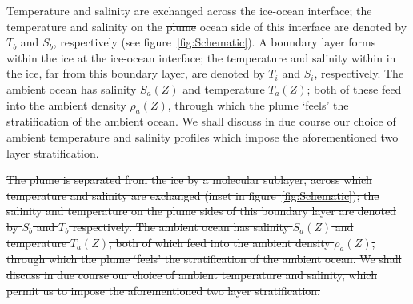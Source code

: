 \documentclass[openacc]{rsproca_new}%
\newcommand{\red}[1]{{\color{red} #1}}
\newcommand{\blue}[1]{{\color{blue} #1}}
\newcommand{\rout}[1]{\red{\st{#1}}}\newcommand{\ab}[1]{\textcolor{Green}{#1}}\newcommand{\about}[1]{\textcolor{Cyan}{\sout{#1}}}
\begin{document}
Temperature and salinity are exchanged across the ice-ocean interface; the temperature and salinity on the \rout{plume} \blue{ocean} side of this interface are denoted by $T_b$ and $S_b$, respectively (see figure~\ref{fig:Schematic}). A boundary layer forms within the ice at the ice-ocean interface; the temperature and salinity within in the ice, far from this boundary layer, are denoted by $T_i$ and $S_i$, respectively. The ambient ocean has salinity $S_a(Z)$ and temperature $T_a(Z)$; both of these feed into the ambient density $\rho_a(Z)$, through which the plume `feels' the stratification of the ambient ocean.  We shall discuss in due course our choice of ambient temperature and salinity profiles which  impose the aforementioned two layer stratification. 

\rout{The plume is separated from the ice by a molecular sublayer, across which temperature and salinity are exchanged (inset in figure~\ref{fig:Schematic}); the salinity and temperature on the plume sides of this boundary layer are denoted by $S_b$ and $T_b$ respectively. The ambient ocean has salinity $S_a(Z)$ and temperature $T_a(Z)$, both of which feed into the ambient density $\rho_a(Z)$, through which the plume `feels' the stratification of the ambient ocean.  We shall discuss in due course our choice of ambient temperature and salinity, which permit us to impose the aforementioned two layer stratification. }
\end{document}

